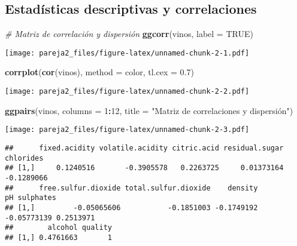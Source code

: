 \documentclass[
]{article}
\newenvironment{Shaded}{\begin{snugshade}}{\end{snugshade}}
\newcommand{\AttributeTok}[1]{\textcolor[rgb]{0.13,0.29,0.53}{#1}}
\newcommand{\CommentTok}[1]{\textcolor[rgb]{0.56,0.35,0.01}{\textit{#1}}}
\newcommand{\ConstantTok}[1]{\textcolor[rgb]{0.56,0.35,0.01}{#1}}
\newcommand{\DecValTok}[1]{\textcolor[rgb]{0.00,0.00,0.81}{#1}}
\newcommand{\FloatTok}[1]{\textcolor[rgb]{0.00,0.00,0.81}{#1}}
\newcommand{\FunctionTok}[1]{\textcolor[rgb]{0.13,0.29,0.53}{\textbf{#1}}}
\newcommand{\NormalTok}[1]{#1}
\newcommand{\SpecialCharTok}[1]{\textcolor[rgb]{0.81,0.36,0.00}{\textbf{#1}}}
\newcommand{\StringTok}[1]{\textcolor[rgb]{0.31,0.60,0.02}{#1}}
\begin{document}
\hypertarget{estaduxedsticas-descriptivas-y-correlaciones}{%
\subsection{Estadísticas descriptivas y
correlaciones}\label{estaduxedsticas-descriptivas-y-correlaciones}}

\begin{Shaded}
\begin{Highlighting}[]
\CommentTok{\# Matriz de correlación y dispersión}
\FunctionTok{ggcorr}\NormalTok{(vinos, }\AttributeTok{label =} \ConstantTok{TRUE}\NormalTok{)}
\end{Highlighting}
\end{Shaded}

\texttt{[image: pareja2\_files/figure-latex/unnamed-chunk-2-1.pdf]}

\begin{Shaded}
\begin{Highlighting}[]
\FunctionTok{corrplot}\NormalTok{(}\FunctionTok{cor}\NormalTok{(vinos), }\AttributeTok{method =} \StringTok{\textquotesingle{}color\textquotesingle{}}\NormalTok{, }\AttributeTok{tl.cex =} \FloatTok{0.7}\NormalTok{)}
\end{Highlighting}
\end{Shaded}

\texttt{[image: pareja2\_files/figure-latex/unnamed-chunk-2-2.pdf]}

\begin{Shaded}
\begin{Highlighting}[]
\FunctionTok{ggpairs}\NormalTok{(vinos, }\AttributeTok{columns =} \DecValTok{1}\SpecialCharTok{:}\DecValTok{12}\NormalTok{, }\AttributeTok{title =} \StringTok{"Matriz de correlaciones y dispersión"}\NormalTok{)}
\end{Highlighting}
\end{Shaded}

\texttt{[image: pareja2\_files/figure-latex/unnamed-chunk-2-3.pdf]}

\begin{Shaded}
\end{Shaded}

\begin{verbatim}
##      fixed.acidity volatile.acidity citric.acid residual.sugar  chlorides
## [1,]     0.1240516       -0.3905578   0.2263725     0.01373164 -0.1289066
##      free.sulfur.dioxide total.sulfur.dioxide    density          pH sulphates
## [1,]         -0.05065606           -0.1851003 -0.1749192 -0.05773139 0.2513971
##        alcohol quality
## [1,] 0.4761663       1
\end{verbatim}
\end{document}
